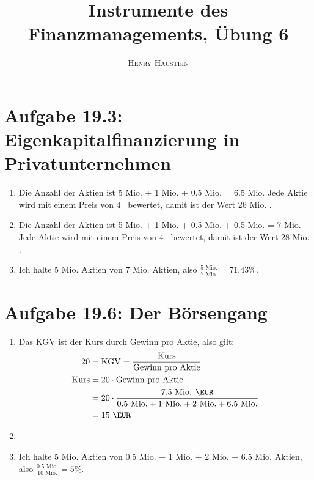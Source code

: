 \documentclass{article}
\title{\textbf{Instrumente des Finanzmanagements, Übung 6}}
\author{\textsc{Henry Haustein}}
\date{}
\begin{document}
	\maketitle

	\section*{Aufgabe 19.3: Eigenkapitalfinanzierung in Privatunternehmen}
	\begin{enumerate}[label=(\alph*)]
		\item Die Anzahl der Aktien ist 5 Mio. + 1 Mio. + 0.5 Mio. = 6.5 Mio. Jede Aktie wird mit einem Preis von 4 \EUR\, bewertet, damit ist der Wert 26 Mio. \EUR.
		\item Die Anzahl der Aktien ist 5 Mio. + 1 Mio. + 0.5 Mio. + 0.5 Mio. = 7 Mio. Jede Aktie wird mit einem Preis von 4 \EUR\, bewertet, damit ist der Wert 28 Mio. \EUR.
		\item Ich halte 5 Mio. Aktien von 7 Mio. Aktien, also $\frac{5\text{ Mio.}}{7\text{ Mio.}} = 71.43\%$.
	\end{enumerate}
	
	\section*{Aufgabe 19.6: Der Börsengang}
	\begin{enumerate}[label=(\alph*)]
		\item Das KGV ist der Kurs durch Gewinn pro Aktie, also gilt:
		\begin{align}
			20 &= \text{KGV} = \frac{\text{Kurs}}{\text{Gewinn pro Aktie}} \notag \\
			\text{Kurs} &= 20\cdot\text{Gewinn pro Aktie} \notag \\
			&= 20\cdot \frac{7.5\text{ Mio. \EUR}}{0.5\text{ Mio.} + 1\text{ Mio.} + 2\text{ Mio.} + 6.5\text{ Mio.}} \notag \\
			&= 15\text{ \EUR} \notag
		\end{align}
		\item \item Ich halte 5 Mio. Aktien von 0.5 Mio. + 1 Mio. + 2 Mio. + 6.5 Mio. Aktien, also $\frac{0.5\text{ Mio.}}{10\text{ Mio.}} = 5\%$.
	\end{enumerate}
\end{document}
